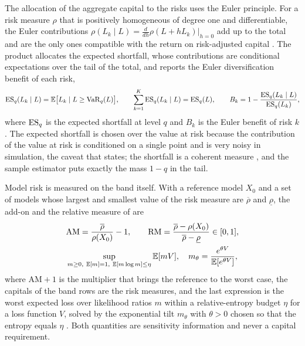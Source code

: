 The allocation of the aggregate capital to the risks uses the Euler principle. For a risk measure $\rho$ that is positively
homogeneous of degree one and differentiable, the Euler contributions $\rho(L_k\mid L)=\tfrac{d}{dh}\rho(L+hL_k)\vert_{h=0}$ add
up to the total and are the only ones compatible with the return on risk-adjusted capital \citep{credit-capital:tasche2008}.
The product allocates the expected shortfall, whose contributions are conditional expectations over the tail of the total, and
reports the Euler diversification benefit of each risk,
\begin{equation}
\operatorname{ES}_q(L_k\mid L)=\mathbb{E}\bigl[L_k\mid L\ge\operatorname{VaR}_q(L)\bigr],\qquad
\sum_{k=1}^{K}\operatorname{ES}_q(L_k\mid L)=\operatorname{ES}_q(L),\qquad
B_k=1-\frac{\operatorname{ES}_q(L_k\mid L)}{\operatorname{ES}_q(L_k)},
\label{eq:ag-euler}
\end{equation}
where $\operatorname{ES}_q$ is the expected shortfall at level $q$ and $B_k$ is the Euler benefit of risk $k$. The expected shortfall is chosen
over the value at risk because the contribution of the value at risk is conditioned on a single point and is very noisy in
simulation, the caveat that \citet{credit-capital:tasche2008} states; the shortfall is a coherent measure
\citep{credit-capital:acerbitasche2002}, and the sample estimator puts exactly the mass $1-q$ in the tail.

Model risk is measured on the band itself. With a reference model $X_0$ and a set of models whose largest and smallest value of
the risk measure are $\overline{\rho}$ and $\underline{\rho}$, the add-on and the relative measure of
\citet{aggregation-stress:barrieu2015} are
\begin{equation}
\begin{gathered}
\mathrm{AM}=\frac{\overline{\rho}}{\rho(X_0)}-1,\qquad
\mathrm{RM}=\frac{\overline{\rho}-\rho(X_0)}{\overline{\rho}-\underline{\rho}}\in[0,1],\\
\sup_{m\ge 0,\ \mathbb{E}[m]=1,\ \mathbb{E}[m\log m]\le\eta}\mathbb{E}[mV],\quad m_\theta=\frac{e^{\theta V}}{\mathbb{E}[e^{\theta V}]},
\end{gathered}
\label{eq:ag-modelrisk}
\end{equation}
where $\mathrm{AM}+1$ is the multiplier that brings the reference to the worst case, the capitals of the band rows are the
risk measures, and the last expression is the worst expected loss over likelihood ratios $m$ within a relative-entropy budget
$\eta$ for a loss function $V$, solved by the exponential tilt $m_\theta$ with $\theta>0$ chosen so that the entropy equals
$\eta$ \citep{aggregation-stress:glasserman2014}. Both quantities are sensitivity information and never a capital requirement.

